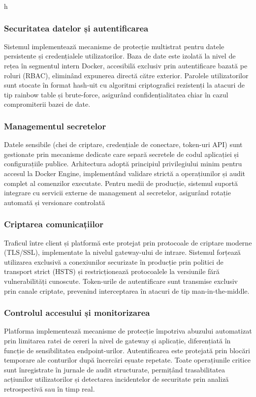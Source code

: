 h\documentclass[12pt,a4paper]{article}
\begin{document}
\subsubsection{Securitatea datelor și autentificarea}
\hspace{1em} Sistemul implementează mecanisme de protecție multistrat pentru datele persistente și credențialele utilizatorilor. Baza de date este izolată la nivel de rețea în segmentul intern Docker, accesibilă exclusiv prin autentificare bazată pe roluri (RBAC), eliminând expunerea directă către exterior. Parolele utilizatorilor sunt stocate în format hash-uit cu algoritmi criptografici rezistenți la atacuri de tip rainbow table și brute-force, asigurând confidențialitatea chiar în cazul compromiterii bazei de date.

\subsubsection{Managementul secretelor}
\hspace{1em} Datele sensibile (chei de criptare, credențiale de conectare, token-uri API) sunt gestionate prin mecanisme dedicate care separă secretele de codul aplicației și configurațiile publice. Arhitectura adoptă principiul privilegiului minim pentru accesul la Docker Engine, implementând validare strictă a operațiunilor și audit complet al comenzilor executate. Pentru medii de producție, sistemul suportă integrare cu servicii externe de management al secretelor, asigurând rotație automată și versionare controlată

\subsubsection{Criptarea comunicațiilor}
\hspace{1em} Traficul între client și platformă este protejat prin protocoale de criptare moderne (TLS/SSL), implementate la nivelul gateway-ului de intrare. Sistemul forțează utilizarea exclusivă a conexiunilor securizate în producție prin politici de transport strict (HSTS) și restricționează protocoalele la versiunile fără vulnerabilități cunoscute. Token-urile de autentificare sunt transmise exclusiv prin canale criptate, prevenind interceptarea în atacuri de tip man-in-the-middle.

\subsubsection{Controlul accesului și monitorizarea}
\hspace{1em} Platforma implementează mecanisme de protecție împotriva abuzului automatizat prin limitarea ratei de cereri la nivel de gateway și aplicație, diferențiată în funcție de sensibilitatea endpoint-urilor. Autentificarea este protejată prin blocări temporare ale conturilor după încercări eșuate repetate. Toate operațiunile critice sunt înregistrate în jurnale de audit structurate, permițând trasabilitatea acțiunilor utilizatorilor și detectarea incidentelor de securitate prin analiză retrospectivă sau în timp real.
\end{document}
